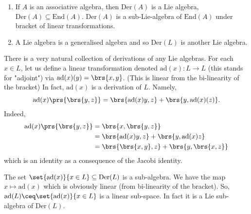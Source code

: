 \documentclass[10pt,a4paper,twoside,openany,hidelinks]{book}
\begin{document}
\begin{example}
\begin{enumerate}
\item If $A$ is an associative algebra, then $\mathrm{Der}(A)$ is a Lie algebra, $\mathrm{Der}(A) \subseteq \mathrm{End}(A)$. $\mathrm{Der}(A)$ is a sub-Lie-algebra of $\mathrm{End}(A)$ under bracket of linear transformations.
\item A Lie algebra is a generalised algebra and so $\mathrm{Der}(L)$ is another Lie algebra.
\end{enumerate}
\end{example}
\begin{fact}[important]
There is a very natural collection of derivations of any Lie algebras.
For each $x \in L$, let us define a linear transformation denoted $\mathrm{ad}(x) \colon L \to L$ (this stands for "adjoint") via
$\mathrm{ad}(x)(y) = \brs{x,y}$. (This is linear from the bi-linearity of the bracket)
In fact, $\mathrm{ad}(x)$ is a derivation of $L$. Namely,
\[\mathrm{ad}(x)\prs{\brs{y,z}} = \brs{\mathrm{ad}(x)y,z} + \brs{y, \mathrm{ad}(x)(z)}\text{.}\]
Indeed,
\begin{align*}
\mathrm{ad}(x)\prs{\brs{y,z}} &= \brs{x,\brs{y,z}} \\
&= \brs{\mathrm{ad}(x)y, z} + \brs{y, \mathrm{ad}(x)z} \\
&= \brs{\brs{x,y},z} + \brs{y,\brs{x,z}}
\end{align*}
which is an identity as a consequence of the Jacobi identity.
\end{fact}
\begin{conclusion}
The set $\set{\mathrm{ad}(x)}{x \in L} \subseteq \mathrm{Der}(L)$ is a sub-algebra.
We have the map $x \mapsto \mathrm{ad}(x)$ which is obviously linear (from bi-linearity of the bracket).
So, $\mathrm{ad}(L) \ceq \set{\mathrm{ad}(x)}{x \in L}$ is a linear sub-space.
In fact it is a Lie sub-algebra of $\mathrm{Der}(L)$.
\end{conclusion}
\end{document}
